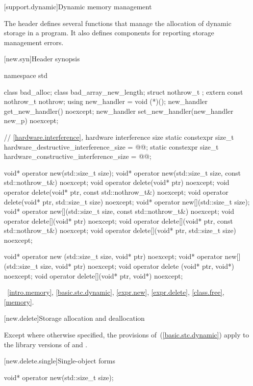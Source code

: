 [support.dynamic]{Dynamic memory management}

\pnum
The header
defines several
functions that manage the allocation of dynamic storage in a program.
It also defines components for reporting storage management errors.

[new.syn]{Header  synopsis}
%
%

\begin{codeblock}
namespace std {
  class bad_alloc;
  class bad_array_new_length;
  struct nothrow_t {};
  extern const nothrow_t nothrow;
  using new_handler = void (*)();
  new_handler get_new_handler() noexcept;
  new_handler set_new_handler(new_handler new_p) noexcept;

  // \ref{hardware.interference}, hardware interference size
  static constexpr size_t hardware_destructive_interference_size = @\impdef{}@;
  static constexpr size_t hardware_constructive_interference_size = @\impdef{}@;
}

void* operator new(std::size_t size);
void* operator new(std::size_t size, const std::nothrow_t&) noexcept;
void  operator delete(void* ptr) noexcept;
void  operator delete(void* ptr, const std::nothrow_t&) noexcept;
void  operator delete(void* ptr, std::size_t size) noexcept;
void* operator new[](std::size_t size);
void* operator new[](std::size_t size, const std::nothrow_t&) noexcept;
void  operator delete[](void* ptr) noexcept;
void  operator delete[](void* ptr, const std::nothrow_t&) noexcept;
void  operator delete[](void* ptr, std::size_t size) noexcept;

void* operator new  (std::size_t size, void* ptr) noexcept;
void* operator new[](std::size_t size, void* ptr) noexcept;
void  operator delete  (void* ptr, void*) noexcept;
void  operator delete[](void* ptr, void*) noexcept;
\end{codeblock}

\xref~\ref{intro.memory}, \ref{basic.stc.dynamic},
\ref{expr.new}, \ref{expr.delete}, \ref{class.free},
\ref{memory}.

[new.delete]{Storage allocation and deallocation}

\pnum
Except where otherwise specified, the provisions of~(\ref{basic.stc.dynamic})
apply to the library versions of  and .

[new.delete.single]{Single-object forms}

%
\begin{itemdecl}
void* operator new(std::size_t size);
\end{itemdecl}

